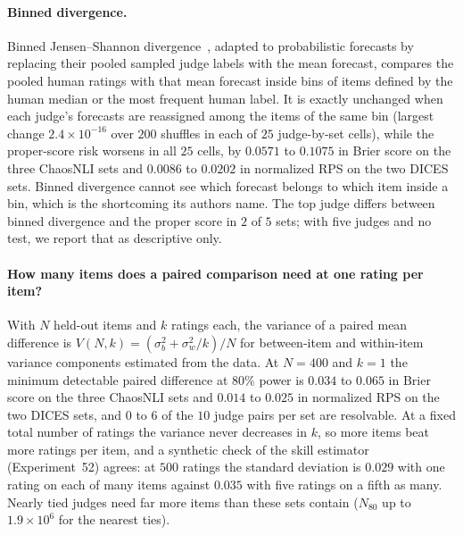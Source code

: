 \paragraph{Binned divergence.}
Binned Jensen--Shannon divergence~\citep[their Eqs.~1 and~2]{elangovan2025beyond}, adapted to probabilistic forecasts by replacing their pooled sampled judge labels with the mean forecast, compares the pooled human ratings with that mean forecast inside bins of items defined by the human median or the most frequent human label.
It is exactly unchanged when each judge's forecasts are reassigned among the items of the same bin (largest change $2.4\times10^{-16}$ over $200$ shuffles in each of $25$ judge-by-set cells), while the proper-score risk worsens in all $25$ cells, by $0.0571$ to $0.1075$ in Brier score on the three ChaosNLI sets and $0.0086$ to $0.0202$ in normalized RPS on the two DICES sets.
Binned divergence cannot see which forecast belongs to which item inside a bin, which is the shortcoming its authors name.
The top judge differs between binned divergence and the proper score in $2$ of $5$ sets; with five judges and no test, we report that as descriptive only.

\paragraph{How many items does a paired comparison need at one rating per item?}
With $N$ held-out items and $k$ ratings each, the variance of a paired mean difference is $V(N,k)=(\sigma_b^2+\sigma_w^2/k)/N$ for between-item and within-item variance components estimated from the data.
At $N=400$ and $k=1$ the minimum detectable paired difference at $80\%$ power is $0.034$ to $0.065$ in Brier score on the three ChaosNLI sets and $0.014$ to $0.025$ in normalized RPS on the two DICES sets, and $0$ to $6$ of the $10$ judge pairs per set are resolvable.
At a fixed total number of ratings the variance never decreases in $k$, so more items beat more ratings per item, and a synthetic check of the skill estimator (Experiment~52) agrees: at $500$ ratings the standard deviation is $0.029$ with one rating on each of many items against $0.035$ with five ratings on a fifth as many.
Nearly tied judges need far more items than these sets contain ($N_{80}$ up to $1.9\times10^{6}$ for the nearest ties).


